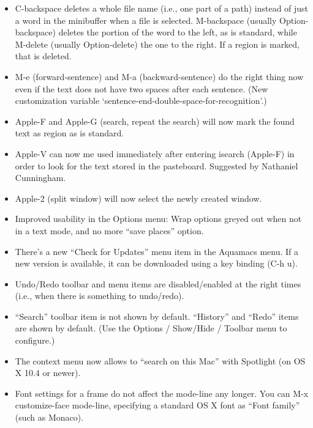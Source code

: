 \begin{itemize}
\item C-backspace deletes a whole file name (i.e., one part of a path)
  instead of just a word in the minibuffer when a file is selected.
  M-backspace (usually Option-backspace) deletes the portion of the word to the left, as is
  standard, while M-delete (usually Option-delete) the one to the right.  If a region is
  marked, that is deleted.

\item M-e (forward-sentence) and M-a (backward-sentence) do the right
  thing now even if the text does not have two spaces after each
  sentence. (New customization variable `sentence-end-double-space-for-recognition'.)

\item Apple-F and Apple-G (search, repeat the search) will now mark
  the found text as region as is standard.

\item Apple-V can now me used immediately after entering isearch (Apple-F) in order to look for the text stored in the pasteboard.
Suggested by Nathaniel Cunningham.

\item Apple-2 (split window) will now select the newly created window.

\item Improved usability in the Options menu: Wrap options greyed out when not in a text mode, and no more ``save places'' option.

\item There's a new ``Check for Updates'' menu item in the Aquamacs
  menu.  If a new version is available, it can be downloaded using a
  key binding (C-h u).

\item Undo/Redo toolbar and menu items are disabled/enabled at the right times (i.e., when there is something to undo/redo).

\item ``Search'' toolbar item is not shown by default.   ``History'' and ``Redo'' items are shown by default. (Use   the Options / Show/Hide / Toolbar menu to configure.)

\item The context menu now allows to ``search on this Mac'' with Spotlight (on OS X 10.4 or newer).

\item Font settings for a frame do not affect the mode-line   any longer. You can M-x customize-face mode-line,   specifying a standard OS X font as ``Font family'' (such   as Monaco).


\end{itemize}
